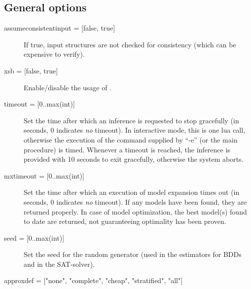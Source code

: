 \subsection{General options}

\begin{description}
	\item[{assumeconsistentinput = [false, true]}] If true, input structures are not checked for consistency (which can be expensive to verify). 
	\item[{xsb = [false, true]}] Enable/disable the usage of \xsb.
	\item[{timeout = [0..max(int)]}] Set the time after which an inference is requested to stop gracefully (in seconds, 0 indicates \emph{no} timeout).
		In interactive mode, this is one lua call, otherwise the execution of the command supplied by ``-e'' (or the main procedure) is timed.
		Whenever a timeout is reached, the inference is provided with 10 seconds to exit gracefully, otherwise the system aborts.				
	\item[{mxtimeout = [0..max(int)]}] Set the time after which an execution of model expansion times out (in seconds, 0 indicates \emph{no} timeout).
		If any models have been found, they are returned properly.
		In case of model optimization, the best model(s) found to date are returned, not guaranteeing optimality has been proven. 
	\item[{seed = [0..max(int)]}] Set the seed for the random generator (used in the estimators for BDDs and in the SAT-solver).
	\item[{approxdef = ["none", "complete", "cheap", "stratified", "all"]}]

\end{description}
